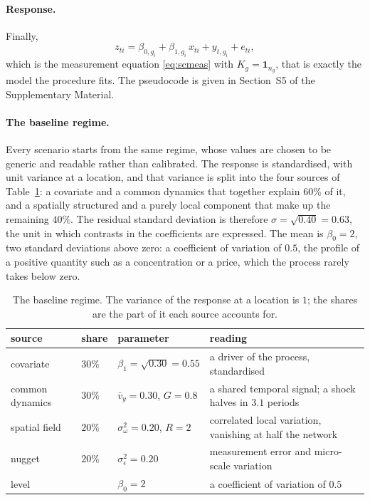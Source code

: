 \paragraph{Response.} Finally,
\begin{equation}
  z_{ti} = \beta_{0,g_i} + \beta_{1,g_i}\,x_{ti} + y_{t,g_i} + e_{ti},
  \label{eq:dgpz}
\end{equation}
which is the measurement equation \eqref{eq:scmeas} with $K_g = \mathbf{1}_{n_g}$, that is exactly the model the procedure fits. The pseudocode is given in Section~S5 of the Supplementary Material.

\paragraph{The baseline regime.} Every scenario starts from the same regime, whose values are chosen to be generic and readable rather than calibrated. The response is standardised, with unit variance at a location, and that variance is split into the four sources of Table~\ref{tab:baseline}: a covariate and a common dynamics that together explain $60\%$ of it, and a spatially structured and a purely local component that make up the remaining $40\%$. The residual standard deviation is therefore $\sigma = \sqrt{0.40} = 0.63$, the unit in which contrasts in the coefficients are expressed. The mean is $\beta_0 = 2$, two standard deviations above zero: a coefficient of variation of $0.5$, the profile of a positive quantity such as a concentration or a price, which the process rarely takes below zero.

\begin{table}[t]
\centering
\caption{The baseline regime. The variance of the response at a location is $1$; the shares are the part of it each source accounts for.}
\label{tab:baseline}
{\small
\begin{tabular}{llll}
\toprule
source & share & parameter & reading \\
\midrule
covariate & $30\%$ & $\beta_1 = \sqrt{0.30} = 0.55$ & a driver of the process, standardised \\
common dynamics & $30\%$ & $\bar v_y = 0.30$, $G = 0.8$ & a shared temporal signal; a shock halves in $3.1$ periods \\
spatial field & $20\%$ & $\sigma^2_\omega = 0.20$, $R = 2$ & correlated local variation, vanishing at half the network \\
nugget & $20\%$ & $\sigma^2_\epsilon = 0.20$ & measurement error and micro-scale variation \\
\midrule
level & & $\beta_0 = 2$ & a coefficient of variation of $0.5$ \\
\bottomrule
\end{tabular}}
\end{table}

